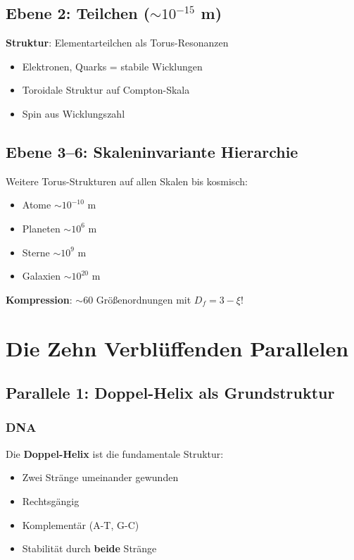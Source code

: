	\subsection{Ebene 2: Teilchen ($\sim 10^{-15}$ m)}
	
	\textbf{Struktur}: Elementarteilchen als Torus-Resonanzen
	\begin{itemize}
		\item Elektronen, Quarks = stabile Wicklungen
		\item Toroidale Struktur auf Compton-Skala
		\item Spin aus Wicklungszahl
	\end{itemize}
	
	\subsection{Ebene 3--6: Skaleninvariante Hierarchie}
	
	Weitere Torus-Strukturen auf allen Skalen bis kosmisch:
	\begin{itemize}
		\item Atome $\sim 10^{-10}$ m
		\item Planeten $\sim 10^{6}$ m  
		\item Sterne $\sim 10^{9}$ m
		\item Galaxien $\sim 10^{20}$ m
	\end{itemize}
	
	\textbf{Kompression}: $\sim 60$ Größenordnungen mit $D_f = 3-\xi$!
	
	\section{Die Zehn Verblüffenden Parallelen}
	
	\subsection{Parallele 1: Doppel-Helix als Grundstruktur}
	
	\subsubsection{DNA}
	
	Die \textbf{Doppel-Helix} ist die fundamentale Struktur:
	\begin{itemize}
		\item Zwei Stränge umeinander gewunden
		\item Rechtsgängig
		\item Komplementär (A-T, G-C)
		\item Stabilität durch \textbf{beide} Stränge
	\end{itemize}
	
